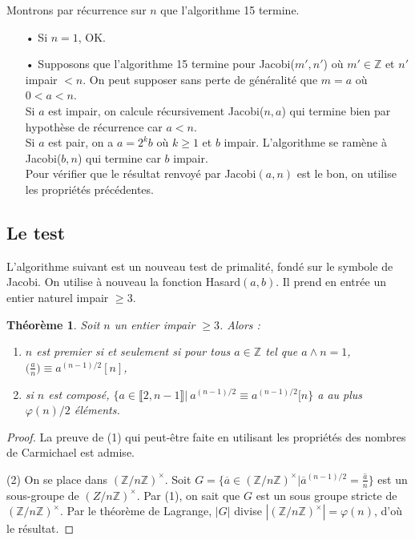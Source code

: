 \documentclass[12pt]{report}
\newtheorem{thm}{Théorème}[chapter]
\newcommand{\Z}{\mathbb{Z}}
\begin{document}
Montrons par récurrence sur $n$ que l'algorithme 15 termine.
\begin{itemize}
\item[•] Si $n=1$, OK.
\item[•] Supposons que l'algorithme 15 termine pour Jacobi($m',n'$) où $m'\in \mathbb{Z}$ et $n'$ impair $<n$. On peut supposer sans perte de généralité que $m=a$ où $0<a<n$.\\
Si $a$ est impair, on calcule récursivement Jacobi($n,a$) qui termine bien par hypothèse de récurrence car $a<n$.\\
Si $a$ est pair, on a $a=2^kb$ où $k \geq 1$ et $b$ impair. L'algorithme se ramène à Jacobi($b,n$) qui termine car $b$ impair. \\
Pour vérifier que le résultat renvoyé par Jacobi$(a,n)$ est le bon, on utilise les propriétés précédentes.
\end{itemize}

\subsection{Le test}

L'algorithme suivant est un nouveau test de primalité, fondé sur le symbole de Jacobi. On utilise à nouveau la fonction Hasard$(a,b)$. Il prend en entrée un entier naturel impair $\geq 3$.\\

\begin{thm}
Soit  $n$ un entier impair $\geq 3$. Alors :\begin{enumerate}
\item $n$ est premier si et seulement si pour tous $a\in \Z$ tel que $a\wedge n=1$, $ \big( \tfrac{a}{n} \big)\equiv a^{(n-1)/2} [n]$,

\item si $n$ est composé, $\{a\in \llbracket 2,n-1\rrbracket|\ a^{(n-1)/2}\equiv a^{(n-1)/2} [n\}$ a au plus $\varphi(n)/2$ éléments.
\end{enumerate}
\end{thm}

\begin{proof}
La preuve de (1) qui peut-être faite en utilisant les propriétés des nombres de Carmichael est admise.

(2) On se place dans $(\Z/n\Z)^\times$. Soit $G= \{\overline{a}\in (\Z/n\Z)^\times |\overline{a}^{(n-1)/2}=\overline{\tfrac{a}{n}}\}$ est un sous-groupe de $(Z/n\Z)^\times$.   Par (1), on sait que $G$ est un sous groupe stricte de $(\Z/n\Z)^\times$. Par le théorème de Lagrange, $|G|$ divise $|(\Z/n\Z)^\times|=\varphi(n)$, d'où le résultat.
\end{proof}
\end{document}

